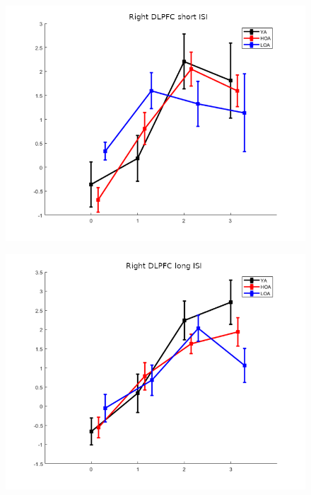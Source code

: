 \documentclass[a4paper,fleqn]{cas-sc}
\begin{document}
\begin{figure}[h!]
    \centering
    \begin{minipage}{0.48\textwidth}
        \centering
        \includegraphics[clip, trim=0 0 0 0, width=\linewidth]{figs/Nback500_rdlpfc_neurosynth.png} %
         \label{fig:a}
    \end{minipage}
    \begin{minipage}{0.48\textwidth}
        \centering
        \includegraphics[clip, trim=0 0 0 0, width=\linewidth]{figs/Nback1500_rdlpfc_neurosynth.png} %

\end{minipage}
\end{figure}
\end{document}
